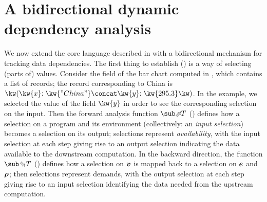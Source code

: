 \section{A bidirectional dynamic dependency analysis}
\label{sec:data-dependencies}

We now extend the core language described in  with a bidirectional mechanism for tracking data dependencies. The first thing to establish () is a way of selecting (parts of) values. Consider the  field of the bar chart computed in , which contains a list of records; the record corresponding to China is $\exRec{\bind{\kw{x}}{\kw{"China"}} \concat \bind{\kw{y}}{\kw{295.3}}}$. In the example, we selected the value of the field $\kw{y}$ in order to see the corresponding selection on the input. Then the forward analysis function $\evalFwdF{T}$ () defines how a selection on a program and its environment (collectively: an \emph{input selection}) becomes a selection on its output; selections represent \emph{availability}, with the input selection at each step giving rise to an output selection indicating the data available to the downstream computation. In the backward direction, the function $\evalBwdF{T}$ () defines how a selection on $\bm{v}$ is mapped back to a selection on $\bm{e}$ and $\bm{\rho}$; then selections represent demands, with the output selection at each step giving rise to an input selection identifying the data needed from the upstream computation.



